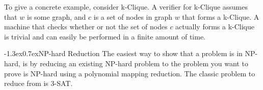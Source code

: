\documentclass[10pt,landscape]{article}
\makeatletter
\renewcommand{\subsection}{\@startsection{subsection}{2}{0pt}%
                           {-1.3ex}{0.7ex}{\normalfont\normalsize\bfseries}}
\makeatother
\begin{document}
\begin{multicols*}{3}
To give a concrete example, consider k-Clique. A verifier for k-Clique assumes
that $w$ is some graph, and $c$ is a set of nodes in graph $w$ that forms
a k-Clique. A machine that checks whether or not the set of nodes $c$ actually
forms a k-Clique is trivial and can easily be performed in a finite amount of
time.

\subsection{NP-hard Reduction}
The easiest way to show that a problem is in NP-hard, is by reducing an existing
NP-hard problem to the problem you want to prove is NP-hard using a polynomial  
mapping reduction. The classic problem to reduce from is 3-SAT.

\end{multicols*}
\end{document}
